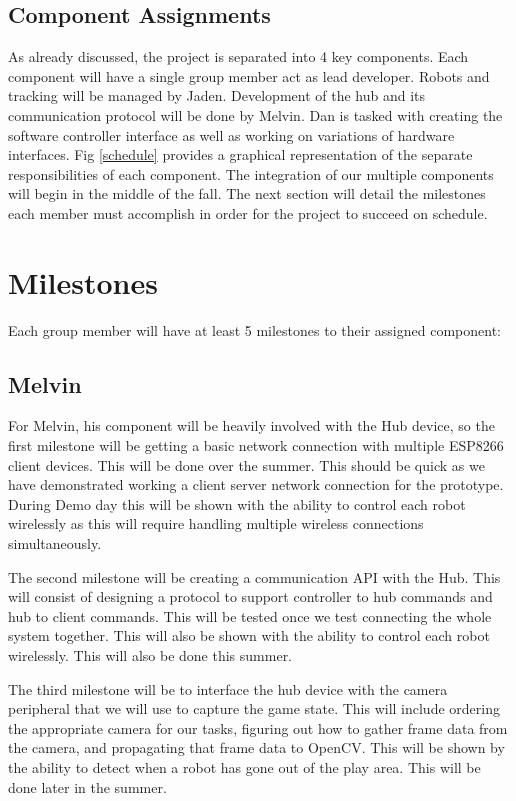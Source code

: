 \documentclass[11pt]{ieeeconf}
\begin{document}
\subsection{Component Assignments}
As already discussed, the project is separated into 4 key components. Each component will have a single group member act as lead developer. Robots and tracking will be managed by Jaden. Development of the hub and its communication protocol will be done by Melvin. Dan is tasked with creating the software controller interface as well as working on variations of hardware interfaces. Fig \ref{schedule} provides a graphical representation of the separate responsibilities of each component. The integration of our multiple components will begin in the middle of the fall. The next section will detail the milestones each member must accomplish in order for the project to succeed on schedule.

\section{Milestones}
Each group member will have at least 5 milestones to their assigned component: 

\subsection{Melvin}
For Melvin, his component will be heavily involved with the Hub device, so the first milestone will be getting a basic network connection with multiple ESP8266 client devices. This will be done over the summer. This should be quick as we have demonstrated working a client server network connection for the prototype. During Demo day this will be shown with the ability to control each robot wirelessly as this will require handling multiple wireless connections simultaneously.

The second milestone will be creating a communication API with the Hub. This will consist of designing a protocol to support controller to hub commands and hub to client commands. This will be tested once we test connecting the whole system together. This will also be shown with the ability to control each robot wirelessly. This will also be done this summer.

The third milestone will be to interface the hub device with the camera peripheral that we will use to capture the game state. This will include ordering the appropriate camera for our tasks, figuring out how to gather frame data from the camera, and propagating that frame data to OpenCV. This will be shown by the ability to detect when a robot has gone out of the play area. This will be done later in the summer.
\end{document}
